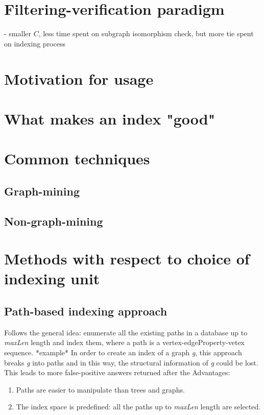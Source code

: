 \documentclass{l4proj}
\newcounter{example}[section]
\begin{document}
\section{Filtering-verification paradigm}
\label{sec:filterVerificationParadigm}
- smaller $C$, less time spent on subgraph isomorphism check, but more tie spent on indexing process

	\section{Motivation for usage}
    \section{What makes an index "good"}
	\section{Common techniques}
    	\subsection{Graph-mining}
    	\subsection{Non-graph-mining}
        \label{subsec:non-data-mining}
    \section{Methods with respect to choice of indexing unit}
        \subsection{Path-based indexing approach}
        Follows the general idea: enumerate all the existing paths in a database up to \textit{maxLen} length and index them, where a path is a vertex-edgeProperty-vetex sequence. *example*
        In order to create an index of a graph \textit{g}, this approach breaks \textit{g} into paths and in this way, the structural information of \textit{g} could be lost. This leads to more false-positive answers returned after the   
        Advantages:
        \begin{enumerate}
            \item Paths are easier to manipulate than trees and graphs.
            \item The index space is predefined: all the paths up to             \textit{maxLen} length are selected.
        \end{enumerate}
        
\end{document}
